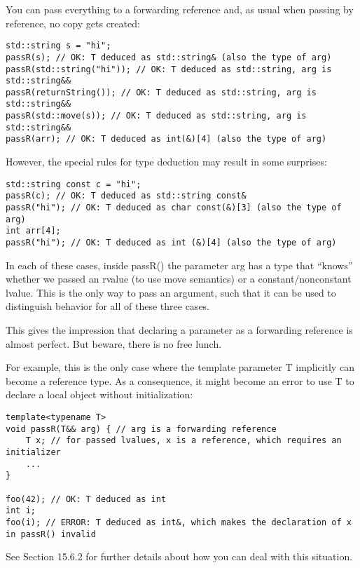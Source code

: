 You can pass everything to a forwarding reference and, as usual when passing by reference, no copy gets created:

\begin{lstlisting}[style=styleCXX]
std::string s = "hi";
passR(s); // OK: T deduced as std::string& (also the type of arg)
passR(std::string("hi")); // OK: T deduced as std::string, arg is std::string&&
passR(returnString()); // OK: T deduced as std::string, arg is std::string&&
passR(std::move(s)); // OK: T deduced as std::string, arg is std::string&&
passR(arr); // OK: T deduced as int(&)[4] (also the type of arg)
\end{lstlisting}

However, the special rules for type deduction may result in some surprises:

\begin{lstlisting}[style=styleCXX]
std::string const c = "hi";
passR(c); // OK: T deduced as std::string const&
passR("hi"); // OK: T deduced as char const(&)[3] (also the type of arg)
int arr[4];
passR("hi"); // OK: T deduced as int (&)[4] (also the type of arg)
\end{lstlisting}

In each of these cases, inside passR() the parameter arg has a type that “knows” whether we passed an rvalue (to use move semantics) or a constant/nonconstant lvalue. This is the only way to pass an argument, such that it can be used to distinguish behavior for all of these three cases.

This gives the impression that declaring a parameter as a forwarding reference is almost perfect. But beware, there is no free lunch.

For example, this is the only case where the template parameter T implicitly can become a reference type. As a consequence, it might become an error to use T to declare a local object without initialization:

\begin{lstlisting}[style=styleCXX]
template<typename T>
void passR(T&& arg) { // arg is a forwarding reference
	T x; // for passed lvalues, x is a reference, which requires an initializer
	...
}

foo(42); // OK: T deduced as int
int i;
foo(i); // ERROR: T deduced as int&, which makes the declaration of x in passR() invalid
\end{lstlisting}

See Section 15.6.2 for further details about how you can deal with this situation.




















